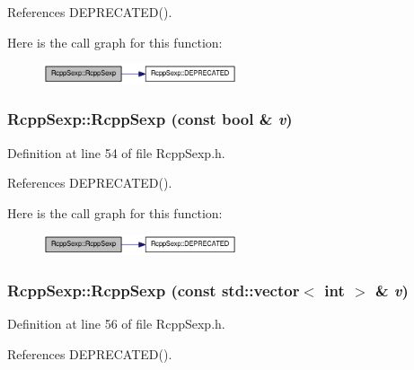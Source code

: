 References DEPRECATED().

Here is the call graph for this function:\nopagebreak
\begin{figure}[H]
\begin{center}
\leavevmode
\includegraphics[width=162pt]{classRcppSexp_a0876ffb6bdb82d6fe2f30a6a73d51dbb_cgraph}
\end{center}
\end{figure}
\hypertarget{classRcppSexp_a57010f894bd69c42720edd71198a266c}{
\subsubsection[{RcppSexp}]{\setlength{\rightskip}{0pt plus 5cm}RcppSexp::RcppSexp (const bool \& {\em v})}}
\label{classRcppSexp_a57010f894bd69c42720edd71198a266c}


Definition at line 54 of file RcppSexp.h.

References DEPRECATED().

Here is the call graph for this function:\nopagebreak
\begin{figure}[H]
\begin{center}
\leavevmode
\includegraphics[width=162pt]{classRcppSexp_a57010f894bd69c42720edd71198a266c_cgraph}
\end{center}
\end{figure}
\hypertarget{classRcppSexp_ab276f77e2cc03da2d60d8826d095d757}{
\subsubsection[{RcppSexp}]{\setlength{\rightskip}{0pt plus 5cm}RcppSexp::RcppSexp (const std::vector$<$ int $>$ \& {\em v})}}
\label{classRcppSexp_ab276f77e2cc03da2d60d8826d095d757}


Definition at line 56 of file RcppSexp.h.

References DEPRECATED().

